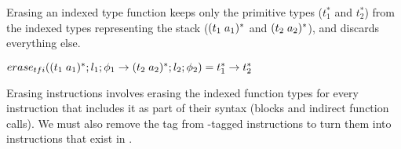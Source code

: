 Erasing an indexed type function keeps only the primitive \wasm types ($t_1^{*}$ and $t_2^{*}$) from the indexed types representing the stack ($\ti{t_1}{a_1}^{*}$ and $\ti{t_2}{a_2}^{*}$), and discards everything else.

\begin{definition}{}

    $\erase[tfi]{\ti{t_1}{a_1}^{*};l_1;\phi_1 \rightarrow \ti{t_2}{a_2}^{*};l_2;\phi_2} = t_1^{*} \rightarrow t_2^{*}$
\end{definition}

Erasing instructions involves erasing the indexed function types for every instruction that includes it as part of their syntax (blocks and indirect function calls).
We must also remove the \prechk tag from \prechk-tagged instructions to turn them into instructions that exist in \wasm.

